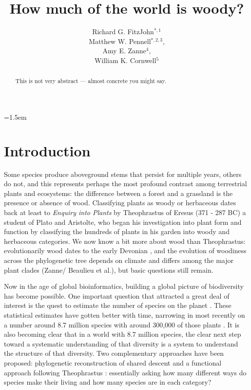 \documentclass[12pt]{article}
\title{How much of the world is woody?}
\author{
Richard G. FitzJohn$^{*,1}$\\ Matthew W. Pennell$^{*,2,3}$,\\ Amy E. Zanne$^{4}$,\\ William K. Cornwell$^{5}$
}
\date{}
\affiliation{\noindent
$^*$ These authors contributed equally}
\begin{document}
\mstitlepage
\parindent=1.5em
\addtolength{\parskip}{.3em}

\begin{abstract}
  This is not very abstract --- almost concrete you might say.
\end{abstract}

\section{Introduction}

Some species produce aboveground stems that persist for multiple years, others do not, and this represents perhaps the most profound contrast among terrestrial plants and ecosystems: the difference between a forest and a grassland is the presence or absence of wood. Classifying plants as woody or herbaceous dates back at least to \textit{Enquiry into Plants} by Theophrastus of Eresus (371 - 287 BC) a student of Plato and Aristolte, who began his investigation into plant form and function by classifying the hundreds of plants in his garden into woody and herbaceous categories.  We now know a bit more about wood than Theophrastus: evolutionarily wood dates to the early Devonian \citep[~400 mya;][]{gerrienne2011simple}, and the evolution of woodiness across the phylogenetic tree depends on climate and differs among the major plant clades (Zanne/ Beaulieu et al.), but basic questions still remain.

Now in the age of global bioinformatics, building a global picture of biodiversity has become possible.  One important question that attracted a great deal of interest is the quest to estimate the number of species on the planet \citep{may1988many,erwin1991many, stork1993many, mora2011plos}.  These statistical estimates have gotten better with time, narrowing in most recently on a number around 8.7 million species with around 300,000 of those plants \citep{mora2011plos}.  It is also becoming clear that in a world with 8.7 million species, the clear next step toward a systematic understanding of that diversity is a system to understand the structure of that diversity.  Two complementary approaches have been proposed: phylogenetic reconstruction of shared descent \citep{smith2011understanding} and a functional approach following Theophrastus \citep[more recently in the tradition of][]{grime1979plant, weiher2009challenging, westoby2002plant}: essentially asking how many different ways do species make their living and how many species are in each category?
\end{document}
